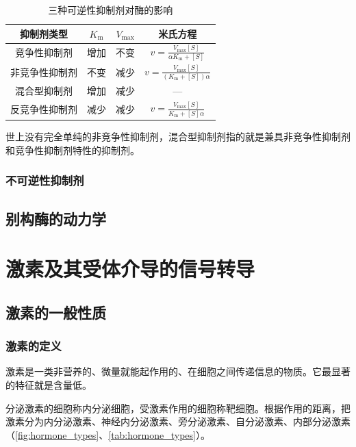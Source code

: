 \begin{table}[htbp]
	\centering
	\begin{tabularx}{\textwidth}{|c|C|C|C|}
		\hline
		\textbf{抑制剂类型} & \textbf{$K_{\text{m}}$} & \textbf{$V_{\text{max}}$} & \textbf{米氏方程} \\ \hline
		竞争性抑制剂 & 增加 & 不变 & $v = \frac{V_{\text{max}} [S]}{\alpha K_{\text{m}} + [S]}$ \\ \hline
		非竞争性抑制剂 & 不变 & 减少 & $v = \frac{V_{\text{max}} [S]}{(K_{\text{m}} + [S])\alpha}$ \\ \hline
		混合型抑制剂 & 增加 & 减少 & --- \\ \hline
		反竞争性抑制剂 & 减少 & 减少 & $v = \frac{V_{\text{max}} [S]}{K_{\text{m}} + [S]\alpha}$ \\ \hline
	\end{tabularx}
	\caption{三种可逆性抑制剂对酶的影响}
	\label{tab:三种可逆性抑制剂对酶的影响}
\end{table}

世上没有完全单纯的非竞争性抑制剂，混合型抑制剂指的就是兼具非竞争性抑制剂和竞争性抑制剂特性的抑制剂。

\subsubsection{不可逆性抑制剂}

\subsection{别构酶的动力学}



\section[激素和信号转导]{激素及其受体介导的信号转导}

\subsection{激素的一般性质}

\subsubsection{激素的定义}

激素是一类非营养的、微量就能起作用的、在细胞之间传递信息的物质。它最显著的特征就是含量低。

分泌激素的细胞称内分泌细胞，受激素作用的细胞称靶细胞。根据作用的距离，把激素分为内分泌激素、神经内分泌激素、旁分泌激素、自分泌激素、内部分泌激素（\autoref{fig:hormone_types}、\autoref{tab:hormone_types}）。

